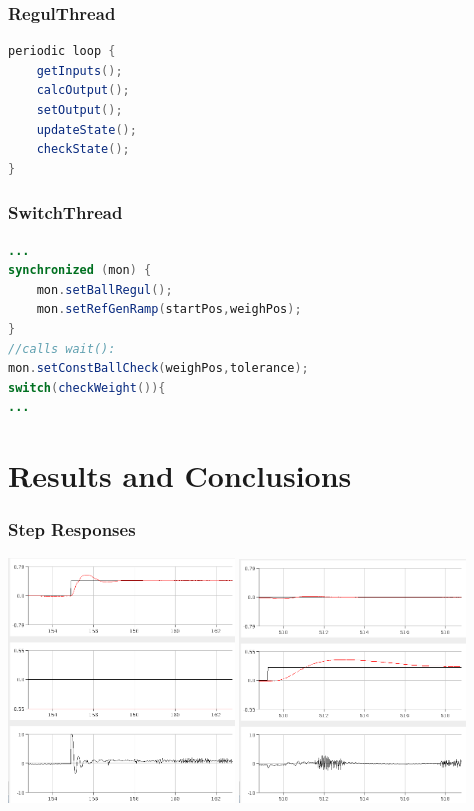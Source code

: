 \documentclass[
compress]
{beamer}
\begin{document}
\begin{frame}[fragile]
\frametitle{RegulThread}
\begin{lstlisting}[language=java,xleftmargin=3em]
periodic loop {
    getInputs();
    calcOutput();
    setOutput();
    updateState();
    checkState();
}
\end{lstlisting}
\end{frame}

\begin{frame}[fragile]
\frametitle{SwitchThread}
\begin{lstlisting}[language=java,xleftmargin=3em]
...
synchronized (mon) {
    mon.setBallRegul();
    mon.setRefGenRamp(startPos,weighPos);
}
//calls wait():
mon.setConstBallCheck(weighPos,tolerance); 
switch(checkWeight()){
...
\end{lstlisting}
\end{frame}

\section{Results and Conclusions}
\frame{\sectionpage}
\begin{frame}
\frametitle{Step Responses}
\centering
\includegraphics[width=0.45\textwidth]{figures/stepresponsebeam-crop.png}
\hspace{1em}
\includegraphics[width=0.45\textwidth]{figures/stepresponseball1-crop.png}
\end{frame}
\end{document}
